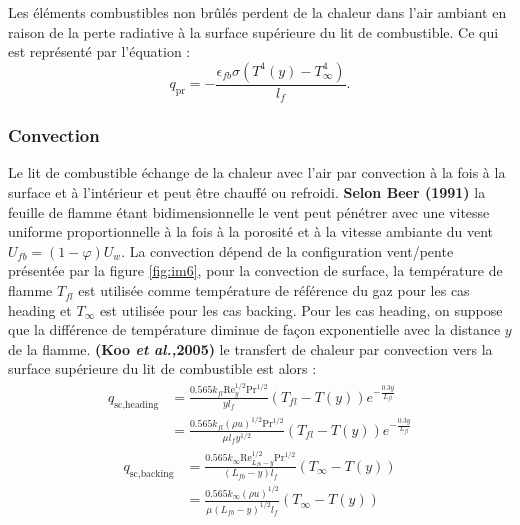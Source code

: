 \documentclass[12pt, oneside]{report} %
\theoremstyle{definition}
\theoremstyle{remark}
\begin{document}
	Les éléments combustibles non brûlés perdent de la chaleur dans l'air ambiant en raison de la perte radiative à la surface supérieure du lit de combustible. Ce qui est représenté par l'équation : 
\begin{equation}
q_{\text{pr}} = -\frac{\epsilon_{fb}\sigma\left(T^4(y) - T_\infty^4\right)}{l_f}.
\end{equation}
		
	
		\subsubsection{Convection}
	Le lit de combustible échange de la chaleur avec l'air par convection à la fois à la surface et à l'intérieur et peut être chauffé ou refroidi.
	\textbf{Selon Beer (1991)} %
	 la feuille de flamme étant bidimensionnelle le vent peut pénétrer avec une vitesse uniforme proportionnelle à la fois à la porosité et à la vitesse ambiante du vent $U_{fb} = (1-\varphi)U_w.$ 
	La convection dépend de la configuration vent/pente présentée par la figure \ref{fig:im6}, pour la convection de surface, la température de flamme $T_{fl}$ est utilisée comme température de référence du gaz pour les cas heading et $T_{\infty}$ est utilisée pour les cas backing. Pour les cas heading, on suppose que la différence de température diminue de façon exponentielle avec la distance $y$ de la flamme. \textbf{(Koo \textit{et al.,}2005)} le transfert de chaleur par convection vers la surface supérieure du lit de combustible est alors : 
		\begin{equation}\label{f:sc1}
			\begin{aligned}
				q_{\text{sc,heading}} &= \frac{0.565k_{fl}\mathrm{Re}_y^{1/2} \mathrm{Pr}^{1/2}}{y l_f}\left(T_{fl}-T(y)\right)e^{-\frac{0.3y}{L_{fl}}} \\
				&= \frac{0.565k_{fl}(\rho u)^{1/2} \mathrm{Pr}^{1/2}}{\mu l_f y^{1/2}}\left(T_{fl}-T(y)\right)e^{-\frac{0.3y}{L_{fl}}}
			\end{aligned}
		\end{equation}
			\begin{equation}\label{f:sc2}
			\begin{aligned}
				q_{\text{sc,backing}} &= \frac{0.565k_\infty \mathrm{Re}_{L_{fb}-y}^{1/2}\mathrm{Pr}^{1/2}}{(L_{fb}-y)l_f}\left(T_\infty-T(y)\right) \\
				&= \frac{0.565k_\infty (\rho u)^{1/2}}{\mu (L_{fb}-y)^{1/2}l_f}\left(T_\infty-T(y)\right)
			\end{aligned}
		\end{equation} 
		
\end{document}
